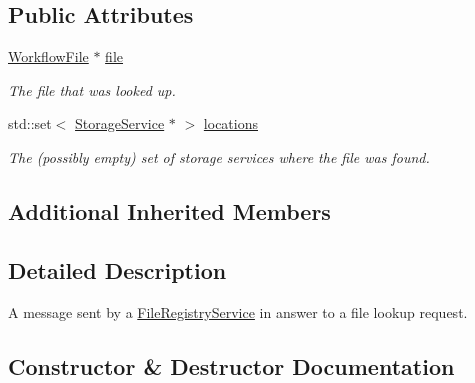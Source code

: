 \subsection*{Public Attributes}
\begin{DoxyCompactItemize}
\item 
\mbox{\label{classwrench_1_1_file_registry_file_lookup_answer_message_a7d2ce0c6eb0b7d89df8d4cb4605c9975}} 
\hyperlink{classwrench_1_1_workflow_file}{Workflow\+File} $\ast$ \hyperlink{classwrench_1_1_file_registry_file_lookup_answer_message_a7d2ce0c6eb0b7d89df8d4cb4605c9975}{file}
\begin{DoxyCompactList}\small\item\em The file that was looked up. \end{DoxyCompactList}\item 
\mbox{\label{classwrench_1_1_file_registry_file_lookup_answer_message_a1ec08876bc0a43b9722065d2eeaba4d5}} 
std\+::set$<$ \hyperlink{classwrench_1_1_storage_service}{Storage\+Service} $\ast$ $>$ \hyperlink{classwrench_1_1_file_registry_file_lookup_answer_message_a1ec08876bc0a43b9722065d2eeaba4d5}{locations}
\begin{DoxyCompactList}\small\item\em The (possibly empty) set of storage services where the file was found. \end{DoxyCompactList}\end{DoxyCompactItemize}
\subsection*{Additional Inherited Members}


\subsection{Detailed Description}
A message sent by a \hyperlink{classwrench_1_1_file_registry_service}{File\+Registry\+Service} in answer to a file lookup request. 

\subsection{Constructor \& Destructor Documentation}
\mbox{\label{classwrench_1_1_file_registry_file_lookup_answer_message_a9abff1af63bffdad71309cce9366fdf8}} 
